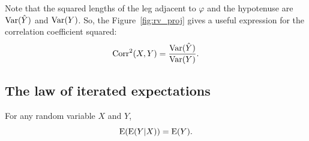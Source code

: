 Note that the squared lengths of the leg adjacent to $\varphi$ and the
hypotenuse are $\operatorname{Var}(\hat Y)$ and $\operatorname{Var}(Y)$.
So, the Figure~\ref{fig:rv_proj} gives a useful expression for the correlation
coefficient squared:
\[
\operatorname{Corr}^2(X,Y) = \frac{\operatorname{Var}(\hat Y)}{\operatorname{Var}(Y)}.
\]

\subsection{The law of iterated expectations}


\begin{theorem}
For any random variable $X$ and $Y$,
\[
\operatorname{E}(\operatorname{E}(Y|X)) = \operatorname{E}(Y).
\]
\end{theorem}

